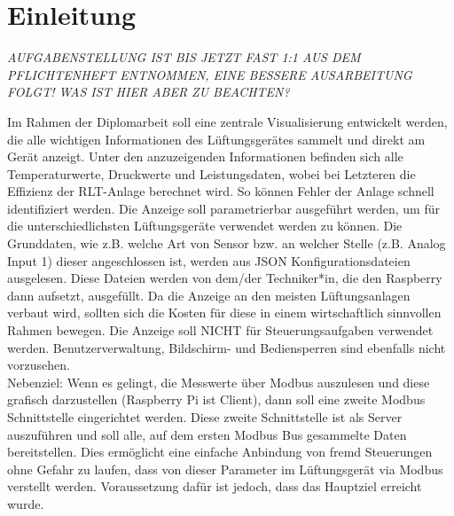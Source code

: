 \chapter{Einleitung} 
\label{aufgabenstellung}
\textit{AUFGABENSTELLUNG IST BIS JETZT FAST 1:1 AUS DEM PFLICHTENHEFT ENTNOMMEN, EINE BESSERE AUSARBEITUNG FOLGT! 
	WAS IST HIER ABER ZU BEACHTEN?}


Im Rahmen der Diplomarbeit soll eine zentrale Visualisierung entwickelt werden, die alle 
wichtigen Informationen des Lüftungsgerätes sammelt und direkt am Gerät anzeigt. Unter 
den anzuzeigenden Informationen befinden sich alle Temperaturwerte, Druckwerte und 
Leistungsdaten, wobei bei Letzteren die Effizienz der RLT-Anlage berechnet wird. So können 
Fehler der Anlage schnell identifiziert werden.
Die Anzeige soll parametrierbar ausgeführt werden, um für die unterschiedlichsten 
Lüftungsgeräte verwendet werden zu können. Die Grunddaten, wie z.B. welche Art von 
Sensor bzw. an welcher Stelle (z.B. Analog Input 1) dieser angeschlossen ist, werden aus JSON Konfigurationsdateien ausgelesen. Diese Dateien werden von dem/der Techniker*in, die den 
Raspberry dann aufsetzt, ausgefüllt.
Da die Anzeige an den meisten Lüftungsanlagen verbaut wird, sollten sich die Kosten für 
diese in einem wirtschaftlich sinnvollen Rahmen bewegen.
Die Anzeige soll NICHT für Steuerungsaufgaben verwendet werden. Benutzerverwaltung, 
Bildschirm- und Bediensperren sind ebenfalls nicht vorzusehen. \\

Nebenziel:
Wenn es gelingt, die Messwerte über Modbus auszulesen und diese grafisch darzustellen (Raspberry Pi ist 
Client), dann soll eine zweite Modbus Schnittstelle eingerichtet werden. Diese zweite 
Schnittstelle ist als Server auszuführen und soll alle, auf dem ersten Modbus Bus
gesammelte Daten bereitstellen. Dies ermöglicht eine einfache Anbindung von fremd 
Steuerungen ohne Gefahr zu laufen, dass von dieser Parameter im Lüftungsgerät via 
Modbus verstellt werden. Voraussetzung dafür ist jedoch, dass das Hauptziel erreicht wurde.

